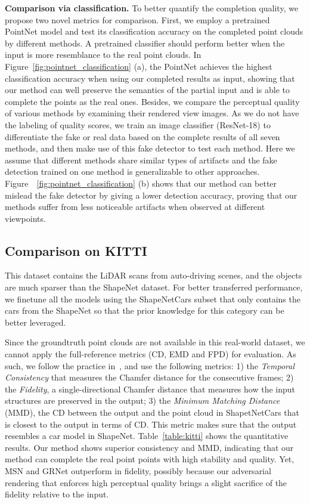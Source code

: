 \documentclass[final]{cvpr}
\begin{document}
\noindent\textbf{Comparison via classification.}
To better quantify the completion quality, we propose two novel metrics for comparison. First, we employ a pretrained PointNet model and test its classification accuracy on the completed point clouds by different methods. A pretrained classifier should perform better when the input is more resemblance to the real point clouds. In Figure~\ref{fig:pointnet_classification} (a), the PointNet achieves the highest classification accuracy when using our completed results as input, showing that our method can well preserve the semantics of the partial input and is able to complete the points as the real ones. Besides, we compare the perceptual quality of various methods by examining their rendered view images. As we do not have the labeling of quality scores, we train an image classifier (ResNet-18) to differentiate the fake or real data based on the complete results of all seven methods, and then make use of this fake detector to test each method. Here we assume that different methods share similar types of artifacts and the fake detection trained on one method is generalizable to other approaches. Figure~~\ref{fig:pointnet_classification} (b) shows that our method can better mislead the fake detector by giving a lower detection accuracy, proving that our methods suffer from less noticeable artifacts when observed at different viewpoints. 


\subsection{Comparison on KITTI}
This dataset contains the LiDAR scans from auto-driving scenes, and the objects are much sparser than the ShapeNet dataset. For better transferred performance, we finetune all the models using the ShapeNetCars subset that only contains the cars from the ShapeNet so that the prior knowledge for this category can be better leveraged. 

Since the groundtruth point clouds are not available in this real-world dataset, we cannot apply the full-reference metrics (CD, EMD and FPD) for evaluation. As such, we follow the practice in~\cite{Yuan-2018-pcn}, and use the following metrics: 1) the \emph{Temporal Consistency} that measures the Chamfer distance for the consecutive frames; 2) the \emph{Fidelity}, a single-directional Chamfer distance that measures how the input structures are preserved in the output;  3) the \emph{Minimum Matching Distance} (MMD), the CD between the output and the point cloud in ShapetNetCars that is closest to the output in terms of CD. This metric makes sure that the output resembles a car model in ShapeNet. Table~\ref{table:kitti} shows the quantitative results. Our method shows superior consistency and MMD, indicating that our method can complete the real point points with high stability and quality. Yet, MSN and GRNet outperform in fidelity, possibly because our adversarial rendering that enforces high perceptual quality brings a slight sacrifice of the fidelity relative to the input.   
\end{document}
